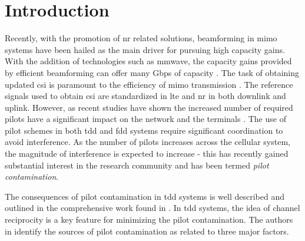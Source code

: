 \section{Introduction}\label{sec:pilot_introduction}

Recently, with the promotion of \gls{nr} related solutions, beamforming in \gls{mimo} systems have been hailed as the main driver for pursuing high capacity gains. With the addition of technologies such as \gls{mmwave}, the capacity gains provided by efficient beamforming can offer many Gbps of capacity \cite{Ahmed2018APerspectives}. The task of obtaining updated \gls{csi} is paramount to the efficiency of \gls{mimo} transmission \cite{Lee2012TheInterference, Medard2000TheChannel}. The reference signals used to obtain \gls{csi} are standardized in \gls{lte} and \gls{nr} in both downlink and uplink. However, as recent studies have shown the increased number of required pilots have a significant impact on the network and the terminals \cite{Elijah2016ASystem}. The use of pilot schemes in both \gls{tdd} and \gls{fdd} systems require significant coordination to avoid interference. As the number of pilots increases across the cellular system, the magnitude of interference is expected to increase - this has recently gained substantial interest in the research community and has been termed \emph{pilot contamination}. 





The consequences of pilot contamination in \gls{tdd} systems is well described and outlined in the comprehensive work found in \cite{Elijah2016ASystem}. In \gls{tdd} systems, the idea of channel reciprocity is a key feature for minimizing the pilot contamination. The authors in \cite{Elijah2016ASystem} identify the sources of pilot contamination as related to three major factors.

